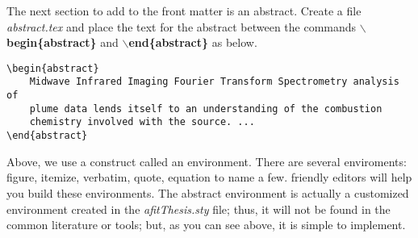 
\noindent The next section to add to the front matter is an abstract.
Create a file {\em abstract.tex} and place the text for the abstract
between the commands {\bf $\backslash$begin\{abstract\}} and {\bf
$\backslash$end\{abstract\}} as below.

\vspace{-0.3in}
{\singlespace
\begin{verbatim}
\begin{abstract}
    Midwave Infrared Imaging Fourier Transform Spectrometry analysis of
    plume data lends itself to an understanding of the combustion
    chemistry involved with the source. ...
\end{abstract}
\end{verbatim}
}

Above, we use a construct called an environment.  There are several
enviroments: figure, itemize,
verbatim, quote, equation to name a few.  \Latex friendly editors will
help you build these environments.  The abstract environment is
actually a customized environment created in the {\em afitThesis.sty}
file; thus, it will not be found in the common \Latex literature or
tools; but, as you can see above, it is simple to implement.


